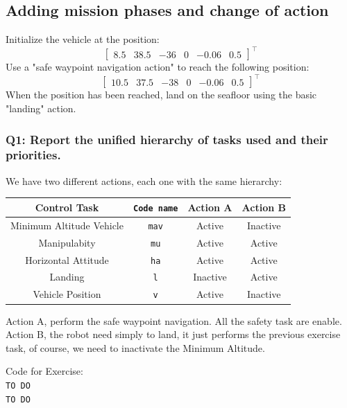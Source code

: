 \documentclass{article}
\begin{document}
\subsection{Adding mission phases and change of action}
Initialize the vehicle at the position:
\begin{displaymath}
\begin{bmatrix} 8.5 & 38.5 & -36 & 0 & -0.06 & 0.5 \end{bmatrix}^\top
\end{displaymath} 
Use a "safe waypoint navigation action" to reach the following position: 
\begin{displaymath}
\begin{bmatrix} 10.5 & 37.5 & -38 & 0 & -0.06 & 0.5 \end{bmatrix}^\top
\end{displaymath} 
When the position has been reached, land on the seafloor using the basic "landing" action.

\subsubsection{Q1: Report the unified hierarchy of tasks used and their priorities.}

We have two different actions, each one with the same hierarchy: 
\begin{center}
\begin{tabular}{ | c | c | c | c |}
\hline
 Control Task & \texttt{Code name} & Action A & Action B \\
\hline
 Minimum Altitude Vehicle &  \texttt{mav} & Active & Inactive  \\  
 Manipulabity &  \texttt{mu} & Active & Active  \\
 Horizontal Attitude &  \texttt{ha} & Active & Active \\
 Landing & \texttt{l} &Inactive & Active \\
 Vehicle Position &  \texttt{v} &Active & Inactive \\
 \hline
\end{tabular}
\end{center}

Action A, perform the safe waypoint navigation. All the safety task are enable. \\
Action B, the robot need simply to land, it just performs the previous exercise task, of course, we need to inactivate the Minimum Altitude. 


\colorbox{mygray}
{\parbox{0.9\textwidth}{Code for Exercise: \\
\texttt{TO DO}\\
\texttt{TO DO}
}}
\end{document}
